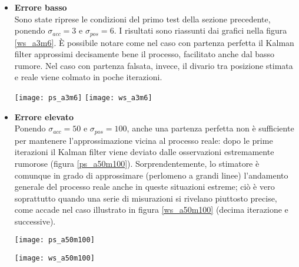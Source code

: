 \begin{itemize}
\item \textbf{Errore basso}\\
Sono state riprese le condizioni del primo test della sezione precedente, ponendo $\sigma_{acc} = 3$ e $\sigma_{pos} = 6$.
I risultati sono riassunti dai grafici nella figura \ref{ws_a3m6}. È possibile notare come nel caso con partenza perfetta il Kalman filter approssimi decisamente bene il processo, facilitato anche dal basso rumore. Nel caso con partenza falsata, invece, il divario tra posizione stimata e reale viene colmato in poche iterazioni.

\begin{minipage}{\linewidth}
	\centering
	\texttt{[image: ps\_a3m6]}
	\texttt{[image: ws\_a3m6]}
	\label{ws_a3m6} 
\end{minipage}

\item \textbf{Errore elevato}\\
Ponendo $\sigma_{acc} = 50$ e $\sigma_{pos} = 100$, anche una partenza perfetta non è sufficiente per mantenere l'approssimazione vicina al processo reale: dopo le prime iterazioni il Kalman filter viene deviato dalle osservazioni estremamente rumorose (figura \ref{ps_a50m100}). Sorprendentemente, lo stimatore è comunque in grado di approssimare (perlomeno a grandi linee) l'andamento generale del processo reale anche in queste situazioni estreme; ciò è vero soprattutto quando una serie di misurazioni si rivelano piuttosto precise, come accade nel caso illustrato in figura \ref{ws_a50m100} (decima iterazione e successive).

\begin{minipage}{\linewidth}
	\centering
	\texttt{[image: ps\_a50m100]}
	\label{ps_a50m100}
\end{minipage}

\begin{minipage}{\linewidth}
	\centering
	\texttt{[image: ws\_a50m100]}
	\label{ws_a50m100}
\end{minipage}


\end{itemize}
